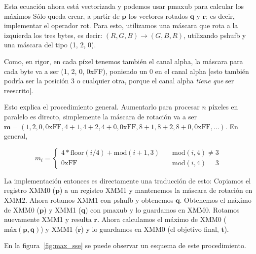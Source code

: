 Esta ecuación ahora está vectorizada y podemos usar {\ttfamily
  pmaxub} para calcular los máximos Sólo queda crear, a partir de
$\mathbf{p}$ los vectores rotados $\mathbf{q}$ y $\mathbf{r}$; es
decir, implementar el operador {\ttfamily rot}. Para esto,
utilizamos una máscara que rota a la izquierda los tres bytes, es
decir: $(R, G, B) \rightarrow (G, B, R)$, utilizando {\ttfamily
  pshufb} y una máscara del tipo (1, 2, 0).

Como, en rigor, en cada píxel tenemos también el canal alpha, la
máscara para cada byte va a ser (1, 2, 0, 0xFF), poniendo un 0 en el
canal alpha [esto también podría ser la posición 3 o cualquier otra,
porque el canal alpha \emph{tiene que} ser reescrito].


Esto explica el procedimiento general. Aumentarlo para procesar $n$
píxeles en paralelo es directo, simplemente la máscara de rotación
va a ser
$\mathbf{m} = (1, 2, 0, \text{0xFF}, 4+1, 4+2, 4+0, \text{0xFF}, 8+1, 8+2, 8+0,
\text{0xFF}, \ldots)$. En general, 

\begin{equation}
  m_i = \left\{
    \begin{array}{ll}
      4*\text{floor}(i/4) + \text{mod}(i + 1, 3) & \quad \text{mod}(i, 4) \ne 3 \\
      \text{0xFF} & \quad \text{mod}(i, 4) = 3
    \end{array}
  \right.
\end{equation}

La implementación entonces es directamente una traducción de esto:
Copiamos el registro {\ttfamily XMM0} ($\mathbf{p}$) a un registro
{\ttfamily XMM1} y mantenemos la máscara de rotación en {\ttfamily
  XMM2}. Ahora rotamos {\ttfamily XMM1} con {\ttfamily pshufb} y
obtenemos $\mathbf{q}$. Obtenemos el máximo de {\ttfamily XMM0}
($\mathbf{p}$) y {\ttfamily XMM1} ($\mathbf{q}$) con {\ttfamily
  pmaxub} y lo guardamos en {\ttfamily XMM0}. Rotamos nuevamente
{\ttfamily XMM1} y resulta $\mathbf{r}$. Ahora calculamos el máximo
de {\ttfamily XMM0} ($\text{máx}(\mathbf{p}, \mathbf{q})$) y
{\ttfamily XMM1} ($\mathbf{r}$) y lo guardamos en {\ttfamily XMM0}
(el objetivo final, $\mathbf{t}$).

En la figura~\ref{fig:max_sse} se puede observar un esquema de este
procedimiento.

